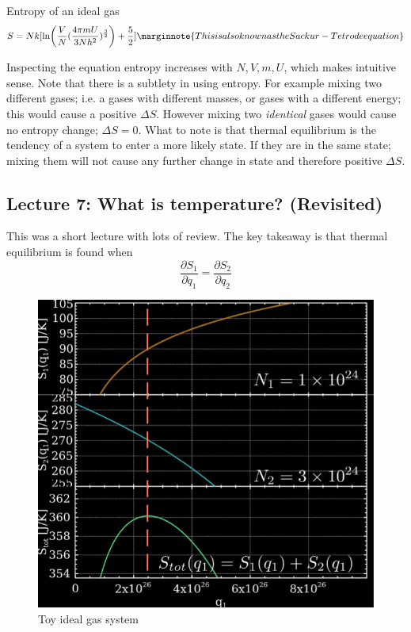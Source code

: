 \documentclass[10pt]{article}
\begin{document}
\begin{theorem}
	Entropy of an ideal gas
	\begin{equation}
		S = Nk [ \ln ( \frac{V}{N} ( \frac{4\pi m U}{3Nh^2} )^{\frac{3}{2}}) + \frac{5}{2} ]
		\label{eq:294:entropy_of_ideal_gas}
		\marginnote{This is also known as the Sackur-Tetrode equation}
	\end{equation}
\end{theorem}



Inspecting the equation entropy increases with $ N, V, m, U$, which makes intuitive sense. 
Note that there is a subtlety in using entropy. 
For example mixing two different gases; i.e. a gases with different masses, or gases with a different energy; this would cause a positive $ \Delta S $.
However mixing two \textit{identical} gases would cause no entropy change; $ \Delta S = 0 $.
What to note is that thermal equilibrium is the tendency of a system to enter a more likely state.
If they are in the same state; mixing them will not cause any further change in state and therefore positive $ \Delta S $.



\subsection{Lecture 7: What is temperature? (Revisited)}
\label{sec:294:lec7}

This was a short lecture with lots of review. The key takeaway is that thermal equilibrium is found when
\begin{equation}
	\frac{\partial S_1}{\partial q_1} = \frac{\partial S_2}{\partial q_2} 
\end{equation}

\begin{figure}[H]
	\centering
	\includegraphics[width=0.8\linewidth]{img/294_temp_energy_deriv.png}
	\caption{Toy ideal gas system}
	\label{fig:294:gas_exchange}
\end{figure}
\end{document}
